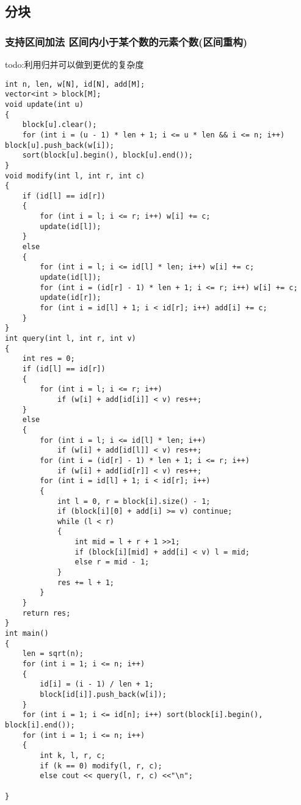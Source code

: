\documentclass[a4paper, fontset=none]{ctexart}
\begin{document}
\subsection{分块}
\subsubsection{支持区间加法 区间内小于某个数的元素个数(区间重构)}
todo:利用归并可以做到更优的复杂度
\begin{verbatim}
int n, len, w[N], id[N], add[M];
vector<int > block[M];
void update(int u)
{
    block[u].clear();
    for (int i = (u - 1) * len + 1; i <= u * len && i <= n; i++) block[u].push_back(w[i]);
    sort(block[u].begin(), block[u].end());
}
void modify(int l, int r, int c)
{
    if (id[l] == id[r])
    {
        for (int i = l; i <= r; i++) w[i] += c;
        update(id[l]);
    }
    else
    {
        for (int i = l; i <= id[l] * len; i++) w[i] += c;
        update(id[l]);
        for (int i = (id[r] - 1) * len + 1; i <= r; i++) w[i] += c;
        update(id[r]);
        for (int i = id[l] + 1; i < id[r]; i++) add[i] += c;
    }
}
int query(int l, int r, int v)
{
    int res = 0;
    if (id[l] == id[r])
    {
        for (int i = l; i <= r; i++)
            if (w[i] + add[id[i]] < v) res++;
    }
    else
    {
        for (int i = l; i <= id[l] * len; i++)
            if (w[i] + add[id[l]] < v) res++;
        for (int i = (id[r] - 1) * len + 1; i <= r; i++)
            if (w[i] + add[id[r]] < v) res++;
        for (int i = id[l] + 1; i < id[r]; i++)
        {
            int l = 0, r = block[i].size() - 1;
            if (block[i][0] + add[i] >= v) continue;
            while (l < r)
            {
                int mid = l + r + 1 >>1;
                if (block[i][mid] + add[i] < v) l = mid;
                else r = mid - 1;
            }
            res += l + 1;
        }
    }
    return res;
}
int main()
{
    len = sqrt(n);
    for (int i = 1; i <= n; i++)
    {
        id[i] = (i - 1) / len + 1;
        block[id[i]].push_back(w[i]);
    }
    for (int i = 1; i <= id[n]; i++) sort(block[i].begin(), block[i].end());
    for (int i = 1; i <= n; i++)
    {
        int k, l, r, c;
        if (k == 0) modify(l, r, c);
        else cout << query(l, r, c) <<"\n";

}
\end{verbatim}
\end{document}
